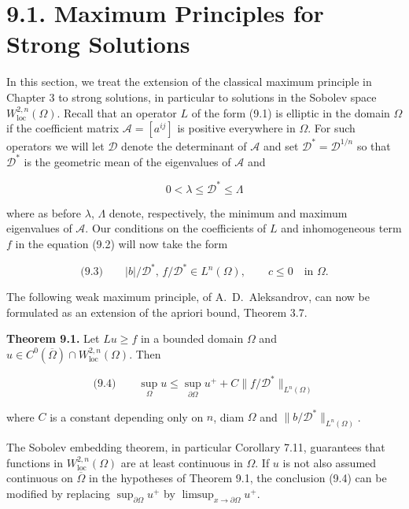 
\pagestyle{empty}


\section*{9.1. Maximum Principles for Strong Solutions}

In this section, we treat the extension of the classical maximum principle in Chapter 3 to strong solutions, in particular to solutions in the Sobolev space $W^{2,n}_{\mathrm{loc}}(\Omega)$. Recall that an operator $L$ of the form (9.1) is elliptic in the domain $\Omega$ if the coefficient matrix $\mathcal{A}=[a^{ij}]$ is positive everywhere in $\Omega$. For such operators we will let $\mathcal{D}$ denote the determinant of $\mathcal{A}$ and set $\mathcal{D}^{*}=\mathcal{D}^{1/n}$ so that $\mathcal{D}^{*}$ is the geometric mean of the eigenvalues of $\mathcal{A}$ and

\[
0<\lambda\le \mathcal{D}^{*}\le \Lambda
\]

where as before $\lambda$, $\Lambda$ denote, respectively, the minimum and maximum eigenvalues of $\mathcal{A}$. Our conditions on the coefficients of $L$ and inhomogeneous term $f$ in the equation (9.2) will now take the form

\[
\text{(9.3)}\qquad |b|/\mathcal{D}^{*},\, f/\mathcal{D}^{*}\in L^{n}(\Omega),\qquad c\le 0 \quad \text{in }\Omega.
\]

The following weak maximum principle, of A.\ D.\ Aleksandrov, can now be formulated as an extension of the apriori bound, Theorem 3.7.

\textbf{Theorem 9.1.}
Let $Lu\ge f$ in a bounded domain $\Omega$ and $u\in C^{0}(\overline{\Omega})\cap W^{2,n}_{\mathrm{loc}}(\Omega)$. Then

\[
\text{(9.4)}\qquad \sup_{\Omega}u\le \sup_{\partial\Omega}u^{+}+C\|f/\mathcal{D}^{*}\|_{L^{n}(\Omega)}
\]

where $C$ is a constant depending only on $n$, diam $\Omega$ and $\|b/\mathcal{D}^{*}\|_{L^{n}(\Omega)}$.

The Sobolev embedding theorem, in particular Corollary 7.11, guarantees that functions in $W^{2,n}_{\mathrm{loc}}(\Omega)$ are at least continuous in $\Omega$. If $u$ is not also assumed continuous on $\overline{\Omega}$ in the hypotheses of Theorem 9.1, the conclusion (9.4) can be modified by replacing $\sup_{\partial\Omega}u^{+}$ by $\limsup_{x\to\partial\Omega}u^{+}$.


